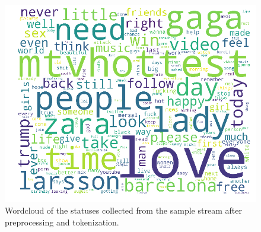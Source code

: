 \begin{figure}
    \centering
    \caption{Wordcloud of the statuses collected from the sample stream after preprocessing and tokenization.}
    \label{fig:wordloud_post}
    \includegraphics[width=12cm]{../images/wordcloud_post.png}
\end{figure}